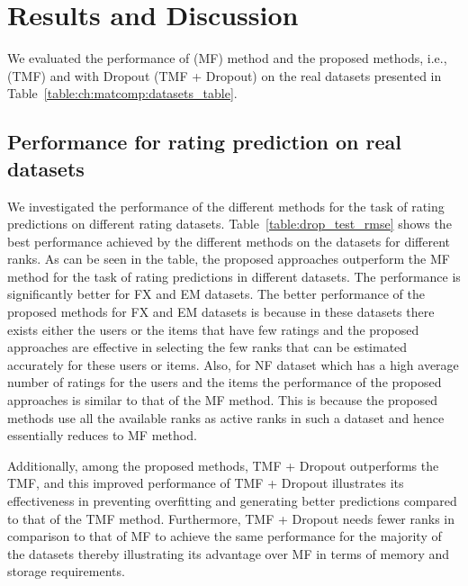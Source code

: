 \section{Results and Discussion}\label{ch:tmf:exp_res}


We evaluated the performance of \MF (MF) method and the proposed methods, i.e.,
\TMF (TMF) and \TMF with Dropout (TMF + Dropout) on the real datasets presented in Table~\ref{table:ch:matcomp:datasets_table}. 


\subsection{Performance for rating prediction on real datasets}
We investigated the performance of the different methods for the task
of rating predictions on different rating datasets. Table~\ref{table:drop_test_rmse} shows the best performance
achieved by the different methods on the datasets for different ranks. As can be seen in the table,
the proposed approaches outperform the MF method for the task of rating
predictions in different datasets. The performance is significantly better for
FX and EM datasets. 
The better performance of the proposed methods for FX and EM datasets is because
in these datasets there exists either the users or the items that have few
ratings and the proposed approaches are effective in selecting the
few ranks that can be estimated accurately for these users or
items.
Also, for NF dataset which has a high average number of ratings for the users
and the items the performance of the proposed approaches is similar to that of
the MF method. This is because the proposed methods use all the available ranks
as active ranks in such a
dataset and hence essentially reduces to MF method.


Additionally, among the proposed methods, TMF +  Dropout
outperforms the TMF, and this improved performance of TMF + Dropout illustrates
its effectiveness in preventing overfitting and generating better predictions compared to that of the TMF
method. 
Furthermore, TMF + Dropout needs fewer ranks in comparison to that of MF to
achieve the same performance for the majority of the datasets thereby
illustrating its advantage over MF in terms of memory and storage requirements.


